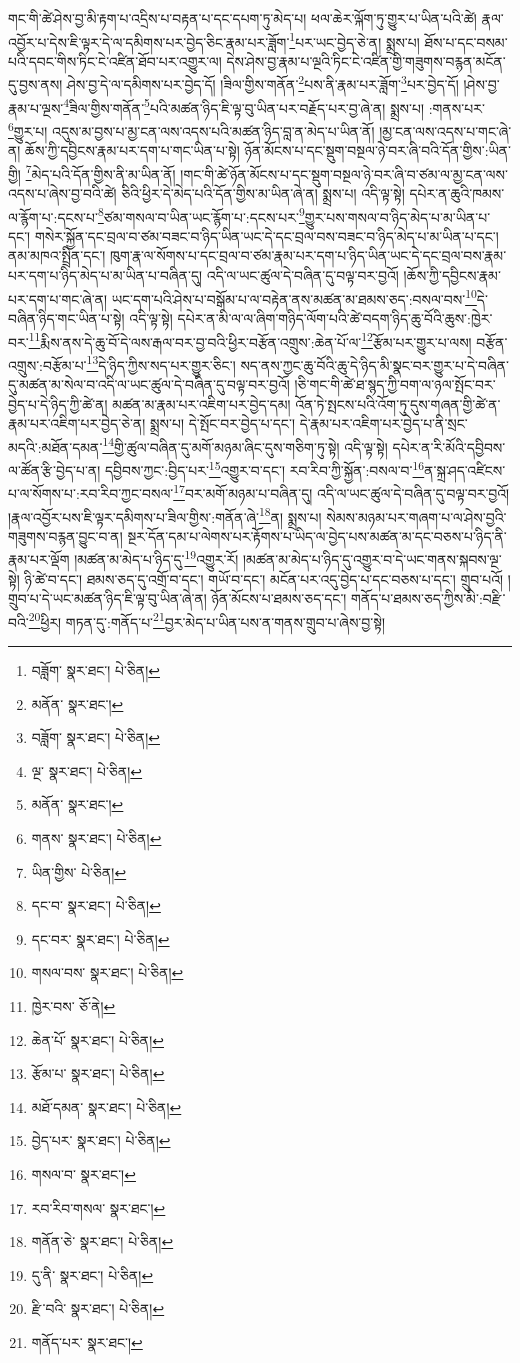 གང་གི་ཚེ་ཤེས་བྱ་མི་རྟག་པ་འདྲིས་པ་བརྟན་པ་དང་དཔག་ཏུ་མེད་པ། ཕལ་ཆེར་ལྐོག་ཏུ་གྱུར་པ་ཡིན་པའི་ཚེ། རྣལ་འབྱོར་པ་དེས་ཇི་ལྟར་དེ་ལ་དམིགས་པར་བྱེད་ཅིང་རྣམ་པར་ཟློག་\footnote{བཟློག་  སྣར་ཐང་།  པེ་ཅིན། }པར་ཡང་བྱེད་ཅེ་ན། སྨྲས་པ། ཐོས་པ་དང་བསམ་པའི་དབང་གིས་ཏིང་ངེ་འཛིན་ཐོབ་པར་འགྱུར་ལ། དེས་ཤེས་བྱ་རྣམ་པ་ལྔའི་ཏིང་ངེ་འཛིན་གྱི་གཟུགས་བརྙན་མངོན་དུ་བྱས་ནས། ཤེས་བྱ་དེ་ལ་དམིགས་པར་བྱེད་དོ། །ཟིལ་གྱིས་གནོན་\footnote{མནོན་  སྣར་ཐང་། }པས་ནི་རྣམ་པར་ཟློག་\footnote{བཟློག་  སྣར་ཐང་།  པེ་ཅིན། }པར་བྱེད་དོ། །ཤེས་བྱ་རྣམ་པ་ལྔས་\footnote{ལྔ་  སྣར་ཐང་།  པེ་ཅིན། }ཟིལ་གྱིས་གནོན་\footnote{མནོན་  སྣར་ཐང་། }པའི་མཚན་ཉིད་ཇི་ལྟ་བུ་ཡིན་པར་བརྗོད་པར་བྱ་ཞེ་ན། སྨྲས་པ། :གནས་པར་\footnote{གནས་  སྣར་ཐང་།  པེ་ཅིན། }གྱུར་པ། འདུས་མ་བྱས་པ་མྱ་ངན་ལས་འདས་པའི་མཚན་ཉིད་བླ་ན་མེད་པ་ཡིན་ནོ། །མྱ་ངན་ལས་འདས་པ་གང་ཞེ་ན། ཆོས་ཀྱི་དབྱིངས་རྣམ་པར་དག་པ་གང་ཡིན་པ་སྟེ། ཉོན་མོངས་པ་དང་སྡུག་བསྔལ་ཉེ་བར་ཞི་བའི་དོན་གྱིས་:ཡིན་གྱི། \footnote{ཡིན་གྱིས་  པེ་ཅིན། }མེད་པའི་དོན་གྱིས་ནི་མ་ཡིན་ནོ། །གང་གི་ཚེ་ཉོན་མོངས་པ་དང་སྡུག་བསྔལ་ཉེ་བར་ཞི་བ་ཙམ་ལ་མྱ་ངན་ལས་འདས་པ་ཞེས་བྱ་བའི་ཚེ། ཅིའི་ཕྱིར་དེ་མེད་པའི་དོན་གྱིས་མ་ཡིན་ཞེ་ན། སྨྲས་པ། འདི་ལྟ་སྟེ། དཔེར་ན་ཆུའི་ཁམས་ལ་རྙོག་པ་:དངས་པ་\footnote{དང་བ་  སྣར་ཐང་།  པེ་ཅིན། }ཙམ་གསལ་བ་ཡིན་ཡང་རྙོག་པ་:དངས་པར་\footnote{དང་བར་  སྣར་ཐང་།  པེ་ཅིན། }གྱུར་པས་གསལ་བ་ཉིད་མེད་པ་མ་ཡིན་པ་དང་། གསེར་སྐྱོན་དང་བྲལ་བ་ཙམ་བཟང་བ་ཉིད་ཡིན་ཡང་དེ་དང་བྲལ་བས་བཟང་བ་ཉིད་མེད་པ་མ་ཡིན་པ་དང་། ནམ་མཁའ་སྤྲིན་དང་། ཁུག་རྣ་ལ་སོགས་པ་དང་བྲལ་བ་ཙམ་རྣམ་པར་དག་པ་ཉིད་ཡིན་ཡང་དེ་དང་བྲལ་བས་རྣམ་པར་དག་པ་ཉིད་མེད་པ་མ་ཡིན་པ་བཞིན་དུ། འདི་ལ་ཡང་ཚུལ་དེ་བཞིན་དུ་བལྟ་བར་བྱའོ། །ཆོས་ཀྱི་དབྱིངས་རྣམ་པར་དག་པ་གང་ཞེ་ན། ཡང་དག་པའི་ཤེས་པ་བསྒོམ་པ་ལ་བརྟེན་ནས་མཚན་མ་ཐམས་ཅད་:བསལ་བས་\footnote{གསལ་བས་  སྣར་ཐང་།  པེ་ཅིན། }དེ་བཞིན་ཉིད་གང་ཡིན་པ་སྟེ། འདི་ལྟ་སྟེ། དཔེར་ན་མི་ལ་ལ་ཞིག་གཉིད་ལོག་པའི་ཚེ་བདག་ཉིད་ཆུ་བོའི་ཆུས་:ཁྱེར་བར་\footnote{ཁྱེར་བས་  ཅོ་ནེ། }རྨིས་ནས་དེ་ཆུ་བོ་དེ་ལས་རྒལ་བར་བྱ་བའི་ཕྱིར་བརྩོན་འགྲུས་:ཆེན་པོ་ལ་\footnote{ཆེན་པོ་  སྣར་ཐང་།  པེ་ཅིན། }རྩོམ་པར་གྱུར་པ་ལས། བརྩོན་འགྲུས་:བརྩོམ་པ་\footnote{རྩོམ་པ་  སྣར་ཐང་།  པེ་ཅིན། }དེ་ཉིད་ཀྱིས་སད་པར་གྱུར་ཅིང་། སད་ནས་ཀྱང་ཆུ་བོའི་ཆུ་དེ་ཉིད་མི་སྣང་བར་གྱུར་པ་དེ་བཞིན་དུ་མཚན་མ་སེལ་བ་འདི་ལ་ཡང་ཚུལ་དེ་བཞིན་དུ་བལྟ་བར་བྱའོ། །ཅི་གང་གི་ཚེ་ཐ་སྙད་ཀྱི་བག་ལ་ཉལ་སྤོང་བར་བྱེད་པ་དེ་ཉིད་ཀྱི་ཚེ་ན། མཚན་མ་རྣམ་པར་འཇིག་པར་བྱེད་དམ། འོན་ཏེ་སྤངས་པའི་འོག་ཏུ་དུས་གཞན་གྱི་ཚེ་ན་རྣམ་པར་འཇིག་པར་བྱེད་ཅེ་ན། སྨྲས་པ། དེ་སྤོང་བར་བྱེད་པ་དང་། དེ་རྣམ་པར་འཇིག་པར་བྱེད་པ་ནི་སྲང་མདའི་:མཐོན་དམན་\footnote{མཐོ་དམན་  སྣར་ཐང་།  པེ་ཅིན། }གྱི་ཚུལ་བཞིན་དུ་མགོ་མཉམ་ཞིང་དུས་གཅིག་ཏུ་སྟེ། འདི་ལྟ་སྟེ། དཔེར་ན་རི་མོའི་དབྱིབས་ལ་ཚོན་རྩི་བྱེད་པ་ན། དབྱིབས་ཀྱང་:བྱིད་པར་\footnote{བྱེད་པར་  སྣར་ཐང་།  པེ་ཅིན། }འགྱུར་བ་དང་། རབ་རིབ་ཀྱི་སྐྱོན་:བསལ་བ་\footnote{གསལ་བ་  སྣར་ཐང་། }ན་སྐྲ་ཤད་འཛིངས་པ་ལ་སོགས་པ་:རབ་རིབ་ཀྱང་བསལ་\footnote{རབ་རིབ་གསལ་  སྣར་ཐང་། }བར་མགོ་མཉམ་པ་བཞིན་དུ། འདི་ལ་ཡང་ཚུལ་དེ་བཞིན་དུ་བལྟ་བར་བྱའོ། །རྣལ་འབྱོར་པས་ཇི་ལྟར་དམིགས་པ་ཟིལ་གྱིས་:གནོན་ཞེ་\footnote{གནོན་ཅེ་  སྣར་ཐང་།  པེ་ཅིན། }ན། སྨྲས་པ། སེམས་མཉམ་པར་གཞག་པ་ལ་ཤེས་བྱའི་གཟུགས་བརྙན་བྱུང་བ་ན། སྔར་དོན་དམ་པ་ལེགས་པར་རྟོགས་པ་ཡིད་ལ་བྱེད་པས་མཚན་མ་དང་བཅས་པ་ཉིད་ནི་རྣམ་པར་ལྡོག །མཚན་མ་མེད་པ་ཉིད་དུ་\footnote{དུ་ནི་  སྣར་ཐང་།  པེ་ཅིན། }འགྱུར་རོ། །མཚན་མ་མེད་པ་ཉིད་དུ་འགྱུར་བ་དེ་ཡང་གནས་སྐབས་ལྔ་སྟེ། ཉི་ཚེ་བ་དང་། ཐམས་ཅད་དུ་འགྲོ་བ་དང་། གཡོ་བ་དང་། མངོན་པར་འདུ་བྱེད་པ་དང་བཅས་པ་དང་། གྲུབ་པའོ། །གྲུབ་པ་དེ་ཡང་མཚན་ཉིད་ཇི་ལྟ་བུ་ཡིན་ཞེ་ན། ཉོན་མོངས་པ་ཐམས་ཅད་དང་། གནོད་པ་ཐམས་ཅད་ཀྱིས་མི་:བརྫི་བའི་\footnote{རྫི་བའི་  སྣར་ཐང་།  པེ་ཅིན། }ཕྱིར། གཏན་དུ་:གནོད་པ་\footnote{གནོད་པར་  སྣར་ཐང་། }བྱར་མེད་པ་ཡིན་པས་ན་གནས་གྲུབ་པ་ཞེས་བྱ་སྟེ། 